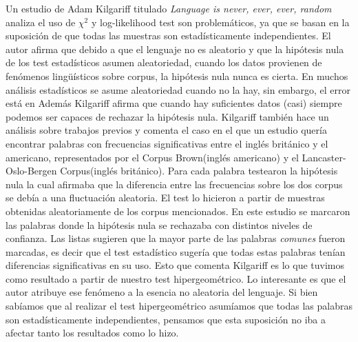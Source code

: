 Un estudio de Adam Kilgariff titulado \textit{Language is never, ever, ever, random}\cite {kilgarriff2005language} analiza el uso de ${\chi}^2$ y log-likelihood test son problemáticos, ya que se basan en la suposición de que todas las muestras son estadísticamente independientes. El autor afirma que debido a que el lenguaje no es aleatorio y que la hipótesis nula de los test estadísticos asumen aleatoriedad, cuando los datos provienen de fenómenos lingüísticos sobre corpus, la hipótesis nula nunca es cierta. En muchos análisis estadísticos se asume aleatoriedad cuando no la hay, sin embargo, el error está en Además Kilgariff afirma que cuando hay suficientes datos (casi) siempre podemos ser capaces de rechazar la hipótesis nula.
Kilgariff también hace un análisis sobre trabajos previos y comenta el caso en el que un estudio quería encontrar palabras con frecuencias significativas entre el inglés británico y el americano, representados por el Corpus Brown(inglés americano) y el Lancaster-Oslo-Bergen Corpus(inglés británico). Para cada palabra testearon la hipótesis nula la cual afirmaba que la diferencia entre las frecuencias sobre los dos corpus se debía a una fluctuación  aleatoria. El test lo hicieron a partir de muestras obtenidas aleatoriamente de los corpus mencionados. En este estudio se marcaron las palabras donde la hipótesis nula se rechazaba con distintos niveles de confianza. Las listas sugieren que la mayor parte de las palabras \textit{comunes} fueron marcadas, es decir que el test estadístico sugería que todas estas palabras tenían diferencias significativas en su uso. Esto que comenta Kilgariff es lo que tuvimos como resultado a partir de nuestro test hipergeométrico. Lo interesante es que el autor atribuye ese fenómeno a la esencia no aleatoria del lenguaje. Si bien sabíamos que al realizar el test hipergeométrico asumíamos que todas las palabras son estadísticamente independientes, pensamos que esta suposición no iba a afectar tanto los resultados como lo hizo.

